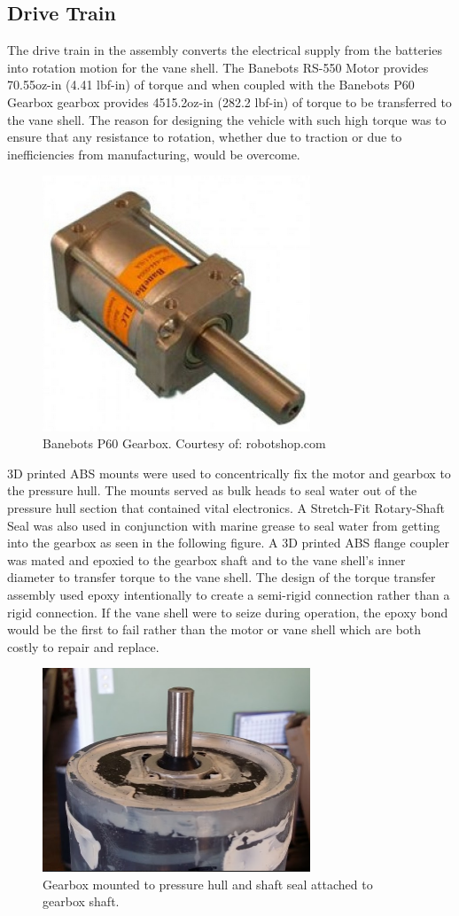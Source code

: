 \documentclass{report}
\begin{document}
\subsection{Drive Train}
The drive train in the assembly converts the electrical supply from the batteries into rotation motion for the vane shell. The Banebots RS-550 Motor provides 70.55oz-in (4.41 lbf-in) of torque and when coupled with the Banebots P60 Gearbox gearbox provides 4515.2oz-in (282.2 lbf-in) of torque to be transferred to the vane shell. The reason for designing the vehicle with such high torque was to ensure that any resistance to rotation, whether due to traction or due to inefficiencies from manufacturing, would be overcome.
\begin{figure}[H]
\centering
\includegraphics[width=8cm]{gearbox}
\caption{Banebots P60 Gearbox. Courtesy of: robotshop.com}
\end{figure}
3D printed ABS mounts were used to concentrically fix the motor and gearbox to the pressure hull. The mounts served as bulk heads to seal water out of the pressure hull section that contained vital electronics. A Stretch-Fit Rotary-Shaft Seal was also used in conjunction with marine grease to seal water from getting into the gearbox as seen in the following figure. A 3D printed ABS flange coupler was mated and epoxied to the gearbox shaft and to the vane shell’s inner diameter to transfer torque to the vane shell. The design of the torque transfer assembly used epoxy intentionally to create a semi-rigid connection rather than a rigid connection.  If the vane shell were to seize during operation, the epoxy bond would be the first to fail rather than the motor or vane shell which are both costly to repair and replace.  
\begin{figure}[H]
\centering
\includegraphics[width=8cm]{motormount}
\caption{Gearbox mounted to pressure hull and shaft seal attached to gearbox shaft.}
\end{figure}
\end{document}
